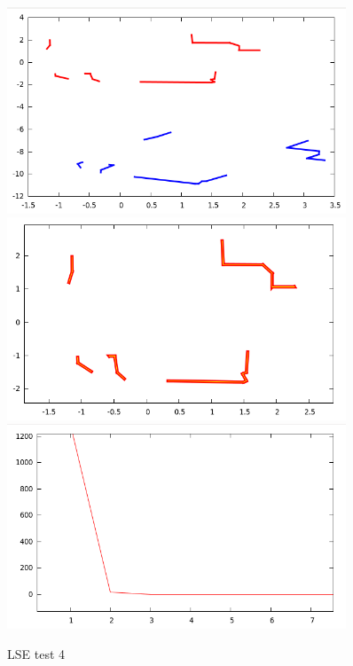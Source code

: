 \documentclass[a4paper, onecolumn]{report}
\begin{document}
\begin{figure}[htbp]
\centering
\includegraphics[width=0.9\textwidth]{images/foto_test/-5_7_0.5236/before_after.png}
\includegraphics[width=0.9\textwidth]{images/foto_test/-5_7_0.5236/result.png}
\includegraphics[width=0.9\textwidth]{images/foto_test/-5_7_0.5236/chi_new.png}

\caption{LSE test 4}
\end{figure}
\end{document}
